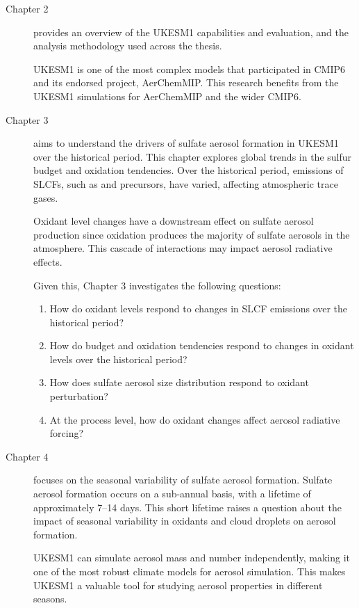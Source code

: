 \begin{description}

    \item [Chapter 2] provides an overview of the UKESM1 capabilities and evaluation, and the analysis methodology used across the thesis. 
    
    UKESM1 is one of the most complex models that participated in CMIP6 and its endorsed project, AerChemMIP. This research benefits from the UKESM1 simulations for AerChemMIP and the wider CMIP6.

    \item [Chapter 3] aims to understand the drivers of sulfate aerosol formation in UKESM1 over the historical period. This chapter explores global trends in the sulfur budget and oxidation tendencies. Over the historical period, emissions of SLCFs, such as  and  precursors, have varied, affecting atmospheric trace gases.

    Oxidant level changes have a downstream effect on sulfate aerosol production since  oxidation produces the majority of sulfate aerosols in the atmosphere. This cascade of interactions may impact aerosol radiative effects. 

    Given this, Chapter 3 investigates the following questions: 

    \begin{enumerate}
        \item  How do oxidant levels respond to changes in SLCF emissions over the historical period?
        \item  How do  budget and oxidation tendencies respond to changes in oxidant levels over the historical period?
        \item How does sulfate aerosol size distribution respond to oxidant perturbation?
        \item At the process level, how do oxidant changes affect aerosol radiative forcing?
    \end{enumerate}

    \item[Chapter 4] focuses on the seasonal variability of sulfate aerosol formation. Sulfate aerosol formation occurs on a sub-annual basis, with a lifetime of approximately 7--14 days. This short lifetime raises a question about the impact of seasonal variability in oxidants and cloud droplets on aerosol formation. 

    UKESM1 can simulate aerosol mass and number independently, making it one of the most robust climate models for aerosol simulation. This makes UKESM1 a valuable tool for studying aerosol properties in different seasons.
    

\end{description}

